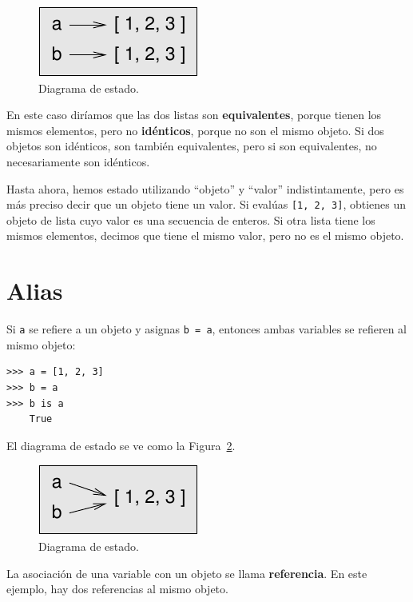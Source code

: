 \documentclass[10pt]{book}
\begin{document}
\begin{figure}
\centerline
{\includegraphics[scale=0.8]{figs/list2.pdf}}
\caption{Diagrama de estado.}
\label{fig.list2}
\end{figure}

En este caso diríamos que las dos listas son {\bf equivalentes},
porque tienen los mismos elementos, pero no {\bf idénticos}, porque
no son el mismo objeto.  Si dos objetos son idénticos, son
también equivalentes, pero si son equivalentes, no necesariamente son
idénticos.

Hasta ahora, hemos estado utilizando ``objeto'' y ``valor''
indistintamente, pero es más preciso decir que un objeto tiene un
valor.  Si evalúas {\tt [1, 2, 3]}, obtienes un objeto de
lista cuyo valor es una secuencia de enteros.  Si otra
lista tiene los mismos elementos, decimos que tiene el mismo valor, pero
no es el mismo objeto.


\section{Alias}

Si {\tt a} se refiere a un objeto y asignas {\tt b = a},
entonces ambas variables se refieren al mismo objeto:

\begin{verbatim}
>>> a = [1, 2, 3]
>>> b = a
>>> b is a
    True
\end{verbatim}
%
El diagrama de estado se ve como la Figura~\ref{fig.list3}.

\begin{figure}
\centerline
{\includegraphics[scale=0.8]{figs/list3.pdf}}
\caption{Diagrama de estado.}
\label{fig.list3}
\end{figure}

La asociación de una variable con un objeto se llama {\bf
referencia}.  En este ejemplo, hay dos referencias al mismo
objeto.
\end{document}
